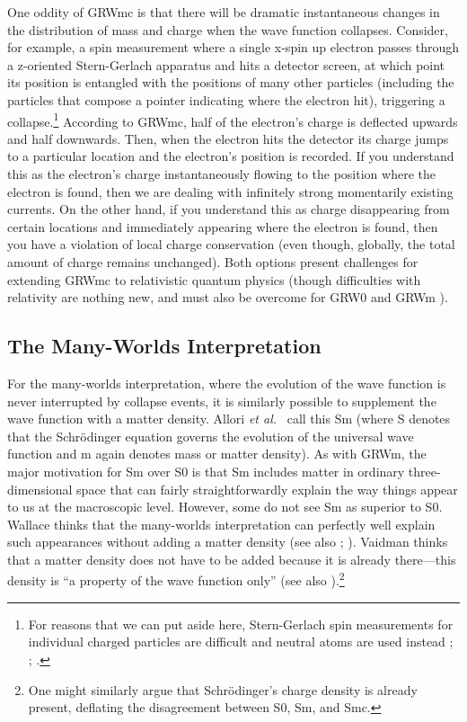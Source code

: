 \documentclass[onecolumn,secnumarabic,amsmath,amssymb,balancelastpage,nofootinbib]{article}
\begin{document}
One oddity of GRWmc is that there will be dramatic instantaneous changes in the distribution of mass and charge when the wave function collapses.  Consider, for example, a spin measurement where a single x-spin up electron passes through a z-oriented Stern-Gerlach apparatus and hits a detector screen, at which point its position is entangled with the positions of many other particles (including the particles that compose a pointer indicating where the electron hit), triggering a collapse.\footnote{For reasons that we can put aside here, Stern-Gerlach spin measurements for individual charged particles are difficult and neutral atoms are used instead \cite[pg.\ 230]{ballentine}; \cite[pg.\ 181]{griffithsQM}; \cite[sec.\ 2]{electronsspinmeasurement}.}  According to GRWmc, half of the electron's charge is deflected upwards and half downwards.  Then, when the electron hits the detector its charge jumps to a particular location and the electron's position is recorded.  If you understand this as the electron's charge instantaneously flowing to the position where the electron is found, then we are dealing with infinitely strong momentarily existing currents.  On the other hand, if you understand this as charge disappearing from certain locations and immediately appearing where the electron is found, then you have a violation of local charge conservation (even though, globally, the total amount of charge remains unchanged).  Both options present challenges for extending GRWmc to relativistic quantum physics (though difficulties with relativity are nothing new, and must also be overcome for GRW0 and GRWm \cite{tumulka2007, maudlin2011, bedingham2014}).



\subsection{The Many-Worlds Interpretation}

For the many-worlds interpretation, where the evolution of the wave function is never interrupted by collapse events, it is similarly possible to supplement the wave function with a matter density.  Allori \emph{et al.}\ \cite{allori2008, allori2011} call this Sm (where S denotes that the Schr\"{o}dinger equation governs the evolution of the universal wave function and m again denotes mass or matter density).  As with GRWm, the major motivation for Sm over S0 is that Sm includes matter in ordinary three-dimensional space that can fairly straightforwardly explain the way things appear to us at the macroscopic level.  However, some do not see Sm as superior to S0.  Wallace \cite{wallace2010, wallace2013} thinks that the many-worlds interpretation can perfectly well explain such appearances without adding a matter density (see also \cite{ney2013}; \cite[sec.\ 10.3]{norsen2017}).  Vaidman \cite[sec.\ 3.1]{vaidman2018} thinks that a matter density does not have to be added because it is already there---this density is ``a property of the wave function only'' (see also \cite{lewis2018}).\footnote{One might similarly argue that Schr\"{o}dinger's charge density is already present, deflating the disagreement between S0, Sm, and Smc.}
\end{document}
